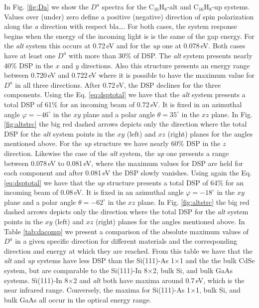 \documentclass[pss]{wiley2sp} %
\begin{document}
In Fig. \ref{fig:Da} we show the $D^{a}$ spectra for the C$_{16}$H$_{8}$-alt and C$_{16}$H$_{8}$-up systems. Values over (under) zero define a positive (negative) direction of spin polarization along the \emph{a} direction with respect {\Large bla\ldots}. For both cases, the system response begins when the energy of the incoming light is is the same of the gap energy. For the \emph{alt} system this occurs at 0.72\,eV and for the \emph{up} one at 0.078\,eV. Both cases have at least one {$D^{a}$} with more than 30\% of DSP. The \emph{alt} system presents nearly 40\% DSP in the $x$ and $y$ directions. Also this structure presents an energy range between 0.720\,eV and 0.722\,eV where it is possible to have the maximum value for $D^{a}$ in all three directions. After 0.72\,eV, the DSP declines for the three components. Using the Eq. \eqref{eq:dsptotal} we have that the \emph{alt} system presents a total DSP of 61\% for an incoming beam of 0.72\,eV. It is fixed in an azimuthal angle $\varphi=-46^{\circ}$ in the $xy$ plane and a polar angle $\theta=35^{\circ}$ in the $xz$ plane. In Fig. \ref{fig:altstrc} the big red dashed arrows depicts only the direction where the total DSP for the \emph{alt} system points in the $xy$ (left) and $xz$ (right) planes for the angles mentioned above. For the \emph{up} structure we have nearly 60\% DSP in the $z$ direction. Likewise the case of the \emph{alt} system, the \emph{up} one presents a range between 0.078\,eV to 0.081\,eV, where the maximum values for DSP are held for each component and after 0.081\,eV the DSP slowly vanishes. Using again the Eq. \eqref{eq:dsptotal} we have that the \emph{up} structure presents a total DSP of 64\% for an incoming beam of 0.08\,eV. It is fixed in an azimuthal angle $\varphi=-18^{\circ}$ in the $xy$ plane and a polar angle $\theta=-62^{\circ}$ in the $xz$ plane. In Fig. \ref{fig:altstrc} the big red dashed arrows depicts only the direction where the total DSP for the \emph{alt} system points in the $xy$ (left) and $xz$ (right) planes for the angles mentioned above. In Table \ref{tab:dacomp} we present a comparison of the absolute maximum values of $D^{a}$ in a given specific direction for different materials and the corresponding direction and energy at which they are reached. From this table we have that the \emph{alt} and \emph{up} systems have less DSP than the Si(111)-As 1$\times$1 and the the bulk CdSe system, but are comparable to the Si(111)-In 8$\times$2, bulk Si, and bulk GaAs systems. Si(111)-In 8$\times$2 and \emph{alt} both have maxima around 0.7\,eV, which is the near infrared range. Conversely, the maxima for Si(111)-As 1$\times$1, bulk Si, and bulk GaAs all occur in the optical energy range.
\end{document}
